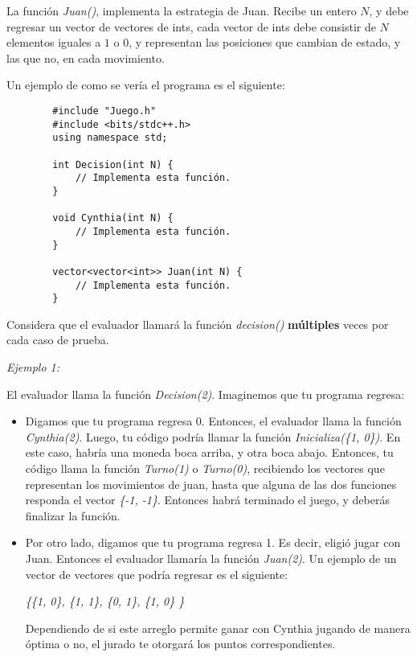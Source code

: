 \documentclass[12pt]{scrartcl}
\begin{document}
    La función \textit{Juan()}, implementa la estrategia de Juan. Recibe un entero $N$, y debe regresar un vector de vectores de ints, cada vector de ints debe consistir de $N$ elementos iguales a $1$ o $0$, y representan las posiciones que cambian de estado, y las que no, en cada movimiento. 

    Un ejemplo de como se vería el programa es el siguiente:

    \begin{verbatim}
        #include "Juego.h"
        #include <bits/stdc++.h>
        using namespace std;

        int Decision(int N) {
            // Implementa esta función.
        }

        void Cynthia(int N) {
            // Implementa esta función.
        }

        vector<vector<int>> Juan(int N) {
            // Implementa esta función.
        }
    \end{verbatim}

    Considera que el evaluador llamará la función \textit{decision()} \textbf{múltiples} veces por cada caso de prueba.


    {\itshape Ejemplo 1:}

        El evaluador llama la función \textit{Decision(2)}. Imaginemos que tu programa regresa:

        \begin{itemize}
            \item Digamos que tu programa regresa 0. Entonces, el evaluador llama la función \textit{Cynthia(2)}. Luego, tu código podría llamar la función \textit{Inicializa(\{1, 0\})}. En este caso, habría una moneda boca arriba, y otra boca abajo. 
            Entonces, tu código llama la función \textit{Turno(1)} o \textit{Turno(0)}, recibiendo los vectores que representan los movimientos de juan, hasta que alguna de las dos funciones responda el vector \textit{\{-1, -1\}}. Entonces habrá terminado el juego, y deberás finalizar la función.
            \item Por otro lado, digamos que tu programa regresa 1. Es decir, eligió jugar con Juan. Entonces el evaluador llamaría la función \textit{Juan(2)}. Un ejemplo de un vector de vectores que podría regresar es el siguiente:

            \begin{center}
                {\itshape \{\{1, 0\}, \{1, 1\}, \{0, 1\}, \{1, 0\} \} }
            \end{center}

            Dependiendo de si este arreglo permite ganar con Cynthia jugando de manera óptima o no, el jurado te otorgará los puntos correspondientes.
            
        \end{itemize}
\end{document}
